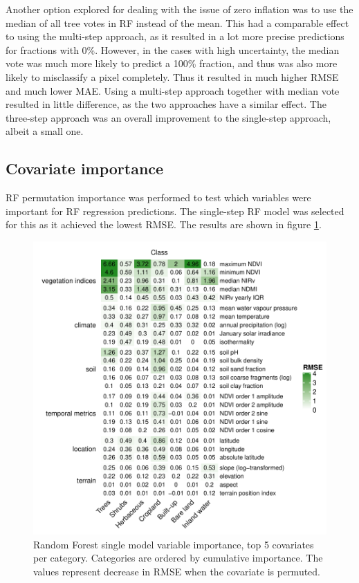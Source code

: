 \documentclass[review,authoryear,3p]{elsarticle}
\begin{document}
Another option explored for dealing with the issue of zero inflation was to use the median of all tree votes in \gls{RF} instead of the mean.
This had a comparable effect to using the multi-step approach, as it resulted in a lot more precise predictions for fractions with 0\%.
However, in the cases with high uncertainty, the median vote was much more likely to predict a 100\% fraction, and thus was also more likely to misclassify a pixel completely.
Thus it resulted in much higher \gls{RMSE} and much lower \gls{MAE}.
Using a multi-step approach together with median vote resulted in little difference, as the two approaches have a similar effect.
The three-step approach was an overall improvement to the single-step approach, albeit a small one.

\subsection{Covariate importance}

\Gls{RF} permutation importance was performed to test which variables were important for \gls{RF} regression predictions.
The single-step \gls{RF} model was selected for this as it achieved the lowest \gls{RMSE}.
The results are shown in figure \ref{fig-varimp}.

\begin{figure}
    \centering
    \includegraphics[width=12cm]{article-figures/heatmaps/2020-06-19-varimp-heatmap-top5}
    \caption{Random Forest single model variable importance, top 5 covariates per category. Categories are ordered by cumulative importance. The values represent decrease in RMSE when the covariate is permuted.}
    \label{fig-varimp}
\end{figure}
\end{document}
